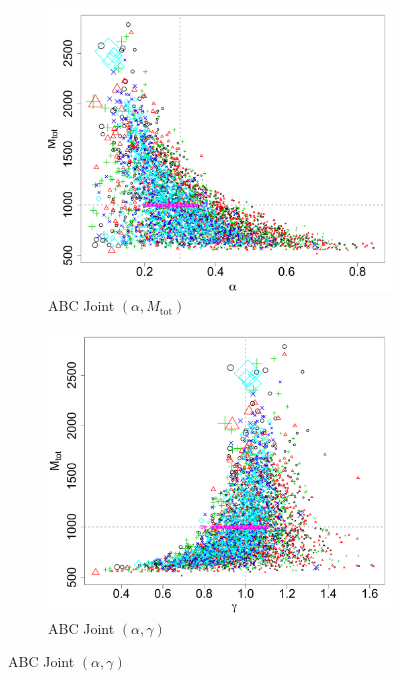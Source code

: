 \documentclass[ejs]{imsart}
\numberwithin{equation}{section}
\theoremstyle{plain}
\newcommand{\Mtot}{M_{\text{tot}}}
\begin{document}
\begin{figure}[htbp]
\begin{subfigure}{0.32\textwidth}
\end{subfigure}
\begin{subfigure}{0.32\textwidth}
\centering
\includegraphics[width = \textwidth]{figures/joint_alpha_mtot_obs.pdf} 
\caption{ABC Joint $(\alpha, \Mtot)$}\label{subfig:joint_mtot_alpha_obs}
\end{subfigure}
\begin{subfigure}{0.32\textwidth}
\centering
\includegraphics[width = \textwidth]{figures/joint_gamma_mtot_obs.pdf} 
\caption{ABC Joint $(\alpha, \gamma)$}\label{subfig:joint_mtot_gamma_obs}

\end{subfigure}
\end{figure}
\end{document}
